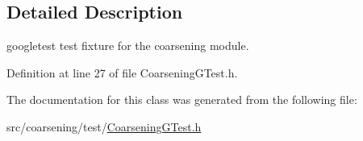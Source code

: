 \subsection{Detailed Description}
googletest test fixture for the coarsening module. 

Definition at line 27 of file Coarsening\-G\-Test.\-h.



The documentation for this class was generated from the following file\-:\begin{DoxyCompactItemize}
\item 
src/coarsening/test/\hyperlink{_coarsening_g_test_8h}{Coarsening\-G\-Test.\-h}\end{DoxyCompactItemize}
